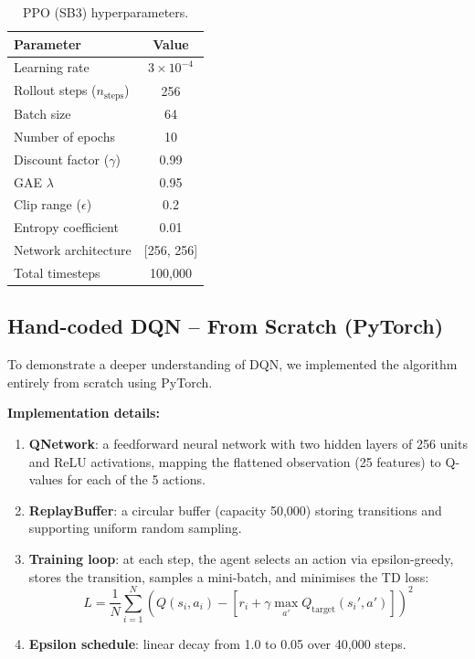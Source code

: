 \documentclass[11pt,a4paper]{article}
\begin{document}
\begin{table}[H]
\centering
\begin{tabular}{lc}
\toprule
\textbf{Parameter} & \textbf{Value} \\
\midrule
Learning rate & $3 \times 10^{-4}$ \\
Rollout steps ($n_{\text{steps}}$) & 256 \\
Batch size & 64 \\
Number of epochs & 10 \\
Discount factor ($\gamma$) & 0.99 \\
GAE $\lambda$ & 0.95 \\
Clip range ($\epsilon$) & 0.2 \\
Entropy coefficient & 0.01 \\
Network architecture & [256, 256] \\
Total timesteps & 100,000 \\
\bottomrule
\end{tabular}
\caption{PPO (SB3) hyperparameters.}
\end{table}

\subsection{Hand-coded DQN -- From Scratch (PyTorch)}

To demonstrate a deeper understanding of DQN, we implemented the algorithm entirely from scratch using PyTorch.

\textbf{Implementation details:}
\begin{enumerate}[nosep]
    \item \textbf{QNetwork}: a feedforward neural network with two hidden layers of 256 units and ReLU activations, mapping the flattened observation (25 features) to Q-values for each of the 5 actions.
    \item \textbf{ReplayBuffer}: a circular buffer (capacity 50,000) storing transitions and supporting uniform random sampling.
    \item \textbf{Training loop}: at each step, the agent selects an action via epsilon-greedy, stores the transition, samples a mini-batch, and minimises the TD loss:
    \[
    L = \frac{1}{N}\sum_{i=1}^{N}\left(Q(s_i, a_i) - \left[r_i + \gamma \max_{a'} Q_{\text{target}}(s_i', a')\right]\right)^2
    \]
    \item \textbf{Epsilon schedule}: linear decay from 1.0 to 0.05 over 40,000 steps.
\end{enumerate}
\end{document}
